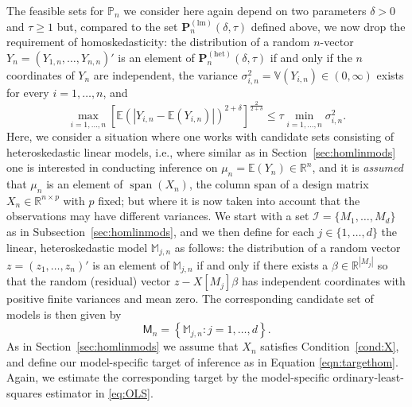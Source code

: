 \documentclass[preprint]{imsart}
\newcommand{\R}{{\mathbb R}}
\newcommand{\E}{{\mathbb E}}
\newcommand{\V}{{\mathbb V}}
\DeclareMathOperator{\s}{span}
\numberwithin{equation}{section}
\begin{document}
The feasible sets for $\mathbb{P}_n$ we consider here again depend on two parameters $\delta > 0$ and $\tau \ge 1$ but, compared to the set $\mathbf{P}_n^{(\mathrm{lm})} \left(\delta, \tau \right)$ defined above, we now drop the requirement of homoskedasticity: the distribution of a random $n$-vector $Y_n = (Y_{1,n}, \hdots, Y_{n,n})'$ is an element of $\mathbf{P}_n^{(\mathrm{het})} \left(\delta, \tau \right)$ if and only if the $n$ coordinates of $Y_n$ are independent, the variance $\sigma_{i,n}^2 = \V(Y_{i,n}) \in(0,\infty)$ exists for every $i = 1, \hdots, n$, and 
%
\begin{equation*}
\max_{i = 1, \hdots, n} \left[\mathbb{E}\left(|Y_{i,n} - \mathbb{E}(Y_{i,n})|\right)^{2+\delta}\right]^{\frac{2}{2+\delta}} \leq \tau \min_{i = 1, \hdots, n} \sigma_{i,n}^2.
\end{equation*}
%
Here, we consider a situation where one works with candidate sets consisting of heteroskedastic linear models, i.e., where similar as in Section~\ref{sec:homlinmods} one is interested in conducting inference on $\mu_n = \E(Y_n)\in\R^n$, and it is \textit{assumed} that $\mu_n$ is an element of  $\s(X_n)$, the column span of a design matrix $X_n \in \R^{n \times p}$ with $p$ fixed; but where it is now taken into account that the observations may have different variances. We start with a set $\mathcal{I} = \{M_1, \hdots, M_d \}$ as in Subsection~\ref{sec:homlinmods}, and we then define for each $j \in \{1, \hdots, d\}$ the linear, heteroskedastic model $\mathbb{M}_{j, n}$ as follows: the distribution of a random vector $z = (z_1, \hdots, z_n)'$ is an element of $\mathbb{M}_{j, n}$ if and only if there exists a $\beta \in \R^{|M_j|}$ so that the random (residual) vector $z - X[M_j]\beta$ has independent coordinates with positive finite variances and mean zero. The corresponding candidate set of models is then given by
%
\begin{equation*}
\mathsf{M}_n = \left\{\mathbb{M}_{j,n}: j = 1, \hdots, d \right\}.
\end{equation*}
%
As in Section~\ref{sec:homlinmods} we assume that $X_n$ satisfies Condition~\ref{cond:X}, and define our model-specific target of inference as in Equation \eqref{eqn:targethom}. Again, we estimate the corresponding target by the model-specific ordinary-least-squares estimator in \eqref{eq:OLS}.
\end{document}
